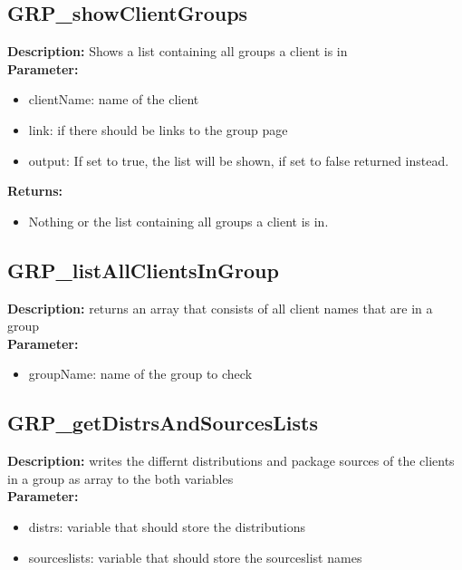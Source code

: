 \subsection{GRP\_showClientGroups}
\textbf{Description:} Shows a list containing all groups a client is in\\
\textbf{Parameter:}
\begin{itemize}
\item clientName: name of the client
\item link: if there should be links to the group page
\item output: If set to true, the list will be shown, if set to false returned instead.
\end{itemize}
\textbf{Returns:}
\begin{itemize}
\item Nothing or the list containing all groups a client is in.
\end{itemize}

\subsection{GRP\_listAllClientsInGroup}
\textbf{Description:} returns an array that consists of all client names that are in a group\\
\textbf{Parameter:}
\begin{itemize}
\item groupName: name of the group to check
\end{itemize}

\subsection{GRP\_getDistrsAndSourcesLists}
\textbf{Description:} writes the differnt distributions and package sources of the clients in a group as array to the both variables\\
\textbf{Parameter:}
\begin{itemize}
\item distrs: variable that should store the distributions
\item sourceslists: variable that should store the sourceslist names
\end{itemize}

